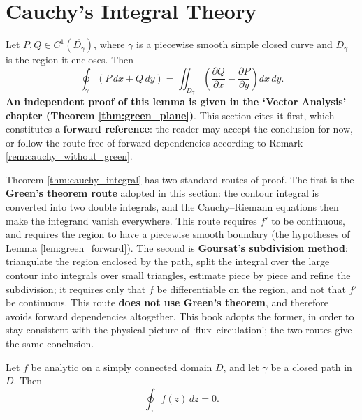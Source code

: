 \section{Cauchy's Integral Theory}\label{sec:cauchy_theory}

\begin{lemma}\label{lem:green_forward}
Let $P, Q \in C^1(\overline{D_\gamma})$, where $\gamma$ is a piecewise smooth simple closed curve and $D_\gamma$ is the region it encloses. Then
\[
\oint_\gamma (P\,dx + Q\,dy) = \iint_{D_\gamma}\left( \frac{\partial Q}{\partial x} - \frac{\partial P}{\partial y} \right) dx\,dy .
\]
\textbf{An independent proof of this lemma is given in the `Vector Analysis' chapter (Theorem \ref{thm:green_plane})}. This section cites it first, which constitutes a \textbf{forward reference}: the reader may accept the conclusion for now, or follow the route free of forward dependencies according to Remark \ref{rem:cauchy_without_green}.
\end{lemma}

\begin{remark}\label{rem:cauchy_without_green}
Theorem \ref{thm:cauchy_integral} has two standard routes of proof. The first is the \textbf{Green's theorem route} adopted in this section: the contour integral is converted into two double integrals, and the Cauchy--Riemann equations then make the integrand vanish everywhere. This route requires $f'$ to be continuous, and requires the region to have a piecewise smooth boundary (the hypotheses of Lemma \ref{lem:green_forward}). The second is \textbf{Goursat's subdivision method}: triangulate the region enclosed by the path, split the integral over the large contour into integrals over small triangles, estimate piece by piece and refine the subdivision; it requires only that $f$ be differentiable on the region, and not that $f'$ be continuous. This route \textbf{does not use Green's theorem}, and therefore avoids forward dependencies altogether. This book adopts the former, in order to stay consistent with the physical picture of `flux--circulation'; the two routes give the same conclusion.
\end{remark}

\begin{theorem}\label{thm:cauchy_integral}
Let $f$ be analytic on a simply connected domain $D$, and let $\gamma$ be a closed path in $D$. Then
\[
\oint_\gamma f(z)\,dz = 0.
\]
\end{theorem}

